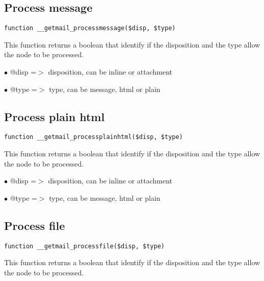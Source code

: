 \documentclass[a4paper]{book}
\begin{document}
\hypertarget{toc33}{}
\subsection{Process message}

\begin{lstlisting}
function __getmail_processmessage($disp, $type)
\end{lstlisting}

This function returns a boolean that identify if the disposition and the type
allow the node to be processed.

\begin{compactitem}
\item[\color{myblue}$\bullet$] @disp =$>$ disposition, can be inline or attachment
\item[\color{myblue}$\bullet$] @type =$>$ type, can be message, html or plain
\end{compactitem}

\hypertarget{toc34}{}
\subsection{Process plain html}

\begin{lstlisting}
function __getmail_processplainhtml($disp, $type)
\end{lstlisting}

This function returns a boolean that identify if the disposition and the type
allow the node to be processed.

\begin{compactitem}
\item[\color{myblue}$\bullet$] @disp =$>$ disposition, can be inline or attachment
\item[\color{myblue}$\bullet$] @type =$>$ type, can be message, html or plain
\end{compactitem}

\hypertarget{toc35}{}
\subsection{Process file}

\begin{lstlisting}
function __getmail_processfile($disp, $type)
\end{lstlisting}

This function returns a boolean that identify if the disposition and the type
allow the node to be processed.
\end{document}
